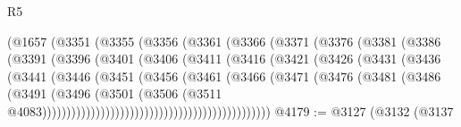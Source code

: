 \begin{lexlean}{R5}
\begin{coremodule}
                            (@1657
                              (@3351
                                (@3355
                                  (@3356
                                    (@3361
                                      (@3366
                                        (@3371
                                          (@3376
                                            (@3381
                                              (@3386
                                                (@3391
                                                  (@3396
                                                    (@3401
                                                      (@3406
                                                        (@3411
                                                          (@3416
                                                            (@3421
                                                              (@3426
                                                                (@3431
                                                                  (@3436
                                                                    (@3441
                                                                      (@3446
                                                                        (@3451
                                                                          (@3456
                                                                            (@3461
                                                                              (@3466
                                                                                (@3471
                                                                                  (@3476
                                                                                    (@3481
                                                                                      (@3486
                                                                                        (@3491
                                                                                          (@3496
                                                                                            (@3501
                                                                                              (@3506
                                                                                                (@3511
                                                                                                  @4083)))))))))))))))))))))))))))))))))))))))))))))))
@4179 := @3127
    (@3132
      (@3137

\end{coremodule}
\end{lexlean}
